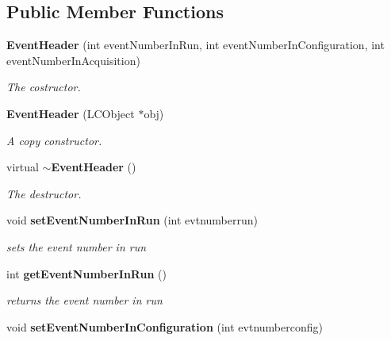 \subsection*{Public Member Functions}
\begin{DoxyCompactItemize}
\item 
{\bf EventHeader} (int eventNumberInRun, int eventNumberInConfiguration, int eventNumberInAcquisition)\label{classCALICE_1_1EventHeader_a61ce4e0faf985f2d70f92c314eb3033a}

\begin{DoxyCompactList}\small\item\em The costructor. \item\end{DoxyCompactList}\item 
{\bf EventHeader} (LCObject $\ast$obj)\label{classCALICE_1_1EventHeader_a211f090b7c628659f5ea559fde21d95b}

\begin{DoxyCompactList}\small\item\em A copy constructor. \item\end{DoxyCompactList}\item 
virtual {\bf $\sim$EventHeader} ()\label{classCALICE_1_1EventHeader_a2e907c74e6642601f41270e5c8d88c17}

\begin{DoxyCompactList}\small\item\em The destructor. \item\end{DoxyCompactList}\item 
void {\bf setEventNumberInRun} (int evtnumberrun)\label{classCALICE_1_1EventHeader_ab962056e1ab5c7f89184c484b495955e}

\begin{DoxyCompactList}\small\item\em sets the event number in run \item\end{DoxyCompactList}\item 
int {\bf getEventNumberInRun} ()\label{classCALICE_1_1EventHeader_a8f50d11349a3b8d497762ac1cae27d44}

\begin{DoxyCompactList}\small\item\em returns the event number in run \item\end{DoxyCompactList}\item 
void {\bf setEventNumberInConfiguration} (int evtnumberconfig)\label{classCALICE_1_1EventHeader_a6c40f09937e882ab0f178eee8453ad03}


\end{DoxyCompactItemize}
